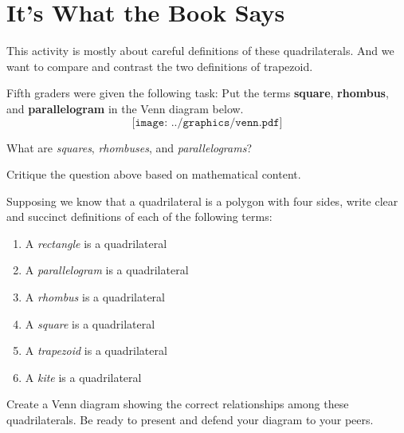 \newpage
\section{It's What the Book Says} 
\begin{teachingnote}
This activity is mostly about careful definitions of these quadrilaterals.  And we want to compare and contrast the two definitions of trapezoid.  
\end{teachingnote}

Fifth graders were given the following task: Put the
terms \textbf{square}, \textbf{rhombus}, and \textbf{parallelogram} in
the Venn diagram below.
\[
\texttt{[image: ../graphics/venn.pdf]}
\]


\begin{prob} 
What are \textit{squares}, \textit{rhombuses}, and
 \textit{parallelograms}?    
\end{prob}
\vspace{1in}

\begin{prob} 
Critique the question above based on mathematical content.
\end{prob}

\newpage 
\begin{prob}
Supposing we know that a quadrilateral is a polygon with four sides, write clear and succinct definitions of each of the following terms: 
\begin{enumerate}
\itemsep18pt
\item A \textit{rectangle} is a quadrilateral 
\item A \textit{parallelogram} is a quadrilateral
\item A \textit{rhombus} is a quadrilateral
\item A \textit{square} is a quadrilateral
\item A \textit{trapezoid} is a quadrilateral
\item A \textit{kite} is a quadrilateral
\end{enumerate}
\end{prob}
\bigskip

\begin{prob} 
Create a Venn diagram showing the correct relationships
among these quadrilaterals. Be ready to present and defend your
diagram to your peers.
\end{prob}
